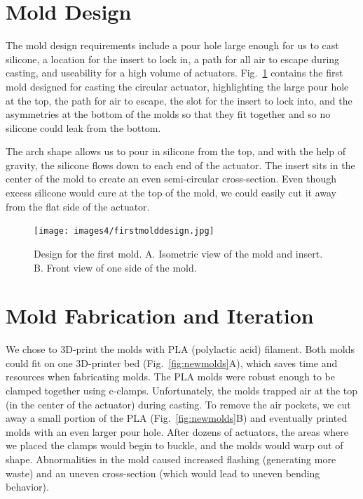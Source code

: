 \section{Mold Design}

The mold design requirements include a pour hole large enough for us to cast silicone, a location for the insert to lock in, a path for all air to escape during casting, and useability for a high volume of actuators. Fig.~\ref{fig:firstmold} contains the first mold designed for casting the circular actuator, highlighting the large pour hole at the top, the path for air to escape, the slot for the insert to lock into, and the asymmetries at the bottom of the molds so that they fit together and so no silicone could leak from the bottom. 

The arch shape allows us to pour in silicone from the top, and with the help of gravity, the silicone flows down to each end of the actuator. The insert sits in the center of the mold to create an even semi-circular cross-section. Even though excess silicone would cure at the top of the mold, we could easily cut it away from the flat side of the actuator. \\

\begin{figure}[!ht]
    \centering
    \texttt{[image: images4/firstmolddesign.jpg]}
    \caption{Design for the first mold. A. Isometric view of the mold and insert. B. Front view of one side of the mold.}
    \label{fig:firstmold}
\end{figure}

\section{Mold Fabrication and Iteration}

We chose to 3D-print the molds with PLA (polylactic acid) filament. Both molds could fit on one 3D-printer bed (Fig.~\ref{fig:newmolds}A), which saves time and resources when fabricating molds. The PLA molds were robust enough to be clamped together using c-clamps. Unfortunately, the molds trapped air at the top (in the center of the actuator) during casting. To remove the air pockets, we cut away a small portion of the PLA (Fig.~\ref{fig:newmolds}B) and eventually printed molds with an even larger pour hole. After dozens of actuators, the areas where we placed the clamps would begin to buckle, and the molds would warp out of shape. Abnormalities in the mold caused increased flashing (generating more waste) and an uneven cross-section (which would lead to uneven bending behavior). 

